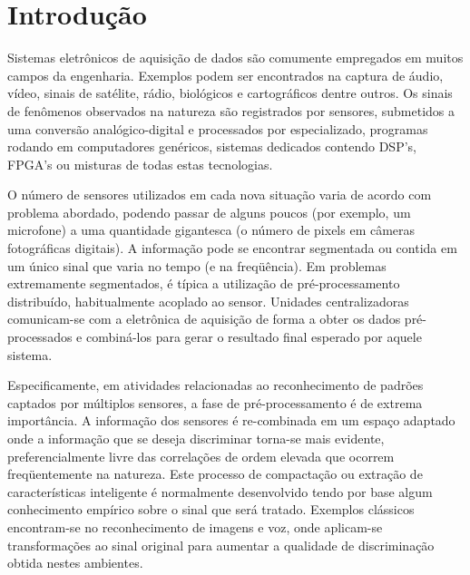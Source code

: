 \typeout{ ====================================================================}
\typeout{ ====================================================================}

\chapter{Introdução}

Sistemas eletrônicos de aquisição de dados são comumente empregados em muitos
campos da engenharia. Exemplos podem ser encontrados na captura de áudio,
vídeo, sinais de satélite, rádio, biológicos e cartográficos dentre outros. Os
sinais de fenômenos observados na natureza são registrados por sensores,
submetidos a uma conversão analógico-digital e processados por 
especializado, programas rodando em computadores genéricos, sistemas dedicados
contendo DSP's, FPGA's ou misturas de todas estas tecnologias.

O número de sensores utilizados em cada nova situação varia de acordo com
problema abordado, podendo passar de alguns poucos (por exemplo, um microfone)
a uma quantidade gigantesca (o número de pixels em câmeras fotográficas
digitais). A informação pode se encontrar segmentada ou contida em um único
sinal que varia no tempo (e na freqüência). Em problemas extremamente
segmentados, é típica a utilização de pré-processamento distribuído,
habitualmente acoplado ao sensor. Unidades centralizadoras comunicam-se com a
eletrônica de aquisição de forma a obter os dados pré-processados e
combiná-los para gerar o resultado final esperado por aquele sistema.

Especificamente, em atividades relacionadas ao reconhecimento de padrões
captados por múltiplos sensores, a fase de pré-processamento é de extrema
importância. A informação dos sensores é re-combinada em um espaço adaptado
onde a informação que se deseja discriminar torna-se mais evidente,
preferencialmente livre das correlações de ordem elevada que ocorrem
freqüentemente na natureza. Este processo de compactação ou extração de
características inteligente é normalmente desenvolvido tendo por base algum
conhecimento empírico sobre o sinal que será tratado. Exemplos clássicos
encontram-se no reconhecimento de imagens e voz, onde aplicam-se
transformações ao sinal original para aumentar a qualidade de discriminação
obtida nestes ambientes.

